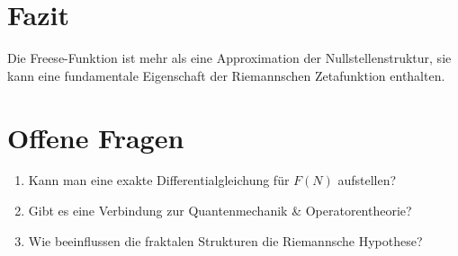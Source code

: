 \documentclass[a4paper,12pt]{article}
\begin{document}
\section{Fazit}
Die Freese-Funktion ist mehr als eine Approximation der Nullstellenstruktur, sie kann eine fundamentale Eigenschaft der Riemannschen Zetafunktion enthalten.

\section{Offene Fragen}
\begin{enumerate}
    \item Kann man eine exakte Differentialgleichung für \( F(N) \) aufstellen?
    \item Gibt es eine Verbindung zur Quantenmechanik & Operatorentheorie?
    \item Wie beeinflussen die fraktalen Strukturen die Riemannsche Hypothese?
\end{enumerate}
\end{document}
